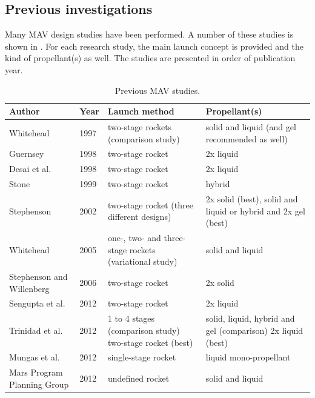 \subsection{Previous investigations}
\label{subsec:prev_invest}
Many \ac{MAV} design studies have been performed. A number of these studies is shown in . For each research study, the main launch concept is provided and the kind of propellant(s) as well. The studies are presented in order of publication year. 

\begin{table}[!ht]
\begin{center}
\caption{Previous \ac{MAV} studies.}
\label{tab:refmavstud}
\begin{tabular}{|p{5cm}|l|p{5cm}|p{5cm}|}
\hline 
\textbf{Author} 		&\textbf{Year} &\textbf{Launch method} & \textbf{Propellant(s)} \\ \hline \hline
Whitehead \cite{whitehead1997} &1997		& two-stage rockets (comparison study)  & solid and liquid (and gel recommended as well)  \\ \hline
Guernsey \cite{guernsey1998} 	&1998	& two-stage rocket & 2x liquid  \\ \hline
Desai et al. \cite{desai1998} &1998	& two-stage rocket & 2x liquid  \\ \hline
Stone	\cite{stone1999} &1999	& two-stage rocket & hybrid  \\ \hline
Stephenson \cite{stephenson2002} 	&2002	& two-stage rocket (three different designs) & 2x solid (best), solid and liquid or hybrid and 2x gel (best)  \\ \hline
Whitehead \cite{whitehead2005} &2005		& one-, two- and three-stage rockets (variational study)  & solid and liquid  \\ \hline
Stephenson and Willenberg 		\cite{stephenson2006} & 2006& two-stage rocket & 2x solid  \\ \hline
Sengupta et al. \cite{sengupta2012} 	&2012	& two-stage rocket & 2x liquid  \\ \hline
Trinidad et al. \cite{trinidad2012} 	&2012	& 1 to 4 stages (comparison study) two-stage rocket (best)  & solid, liquid, hybrid and gel (comparison) 2x liquid (best) \\ \hline
Mungas et al. 	\cite{mungas2012}&2012	& single-stage rocket & liquid mono-propellant  \\ \hline
Mars Program Planning Group 	\cite{mppg2012}	&2012 & undefined rocket & solid and liquid  \\ \hline
 		
\end{tabular}
\end{center}
\end{table} 

